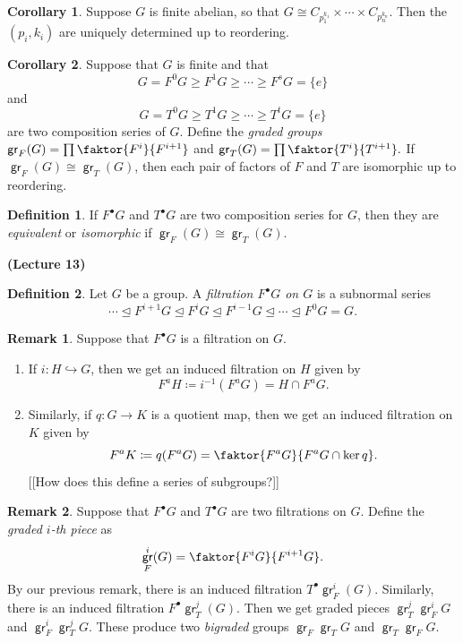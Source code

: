 \documentclass[10pt,letterpaper,cm]{nupset}
\theoremstyle{definition}
\newtheorem*{definition}{Definition}
\newtheorem{remark}{Remark}
\newtheorem{corollary}{Corollary}
\newcommand{\1}{\mathbf{1}}
\newcommand{\0}{\vec 0}
\DeclareMathOperator{\gr}{\mathsf{gr}}
\begin{document}
\begin{corollary}
Suppose $G$ is finite abelian, so that $G \cong C_{p_1^{k_1}} \times \cdots \times C_{p_n^{k_n}}$. Then the $(p_i, k_i)$ are uniquely determined up to reordering.
\end{corollary}

\begin{corollary}
Suppose that $G$ is finite and that $$ G = F^0G \geq F^1G \geq \cdots \geq F^sG = \{e\}  $$ and $$G = T^0G \geq T^1G \geq \cdots \geq T^tG = \{e\}$$ are two composition series of $G$. Define the \textit{graded groups} $\gr_F(G) = \prod \faktor{F^i}{F^{i+1}}$ and $\gr_T(G) = \prod \faktor{T^i}{T^{i+1}}.$ If $\gr_F(G) \cong \gr_T(G)$, then each pair of factors of $F$ and $T$ are isomorphic up to reordering. 
\end{corollary}

\begin{definition}
If $F^{\bullet}G$ and $T^{\bullet}G$ are two composition series for $G$, then they are \textit{equivalent} or \textit{isomorphic} if $\gr_F(G) \cong \gr_T(G)$.
\end{definition}

\begin{center}
{\textbf{(Lecture 13)}} 
\end{center}

\begin{definition}
Let $G$ be a group. A \textit{filtration $F^{\bullet}{G}$ on $G$} is a subnormal series
\[
\cdots \unlhd F^{i+1}{G} \unlhd F^i{G} \unlhd F^{i-1}{G} \unlhd \cdots \unlhd F^0{G} = G
.\]
\end{definition}

\begin{remark} Suppose that $F^{\bullet}G$ is a filtration on $G$.
\begin{enumerate}
\item If $i : H \hookrightarrow G$, then we get an induced filtration on $H$ given by $$F^a{H}\coloneqq  i^{-1}(F^aG) = H \cap F^a{G}.$$
\item Similarly, if $q: G \to K$ is a quotient map, then we get an induced filtration on $K$ given by $$F^aK\coloneqq  q(F^aG) = \faktor{F^aG}{F^aG \cap \ker q}.$$ {[[How does this define a series of subgroups?]]}
\end{enumerate}
\end{remark}

\begin{remark}
Suppose that $F^{\bullet}G$ and $T^{\bullet}G$ are two filtrations on $G$. Define the \textit{graded $i$-th piece} as $$\gr_F^i(G) = \faktor{F^iG}{F^{i+1}G}.$$ By our previous remark, there is an induced filtration $T^{\bullet}\gr_F^i(G)$. Similarly, there is an induced filtration $F^{\bullet}\gr_T^j(G)$. Then we get graded pieces $\gr_T^j\gr_F^iG$ and $\gr_F^i \gr_T^j G$. These produce two \textit{bigraded} groups $\gr_F\gr_TG$ and $\gr_T\gr_FG$.
\end{remark}
\end{document}
